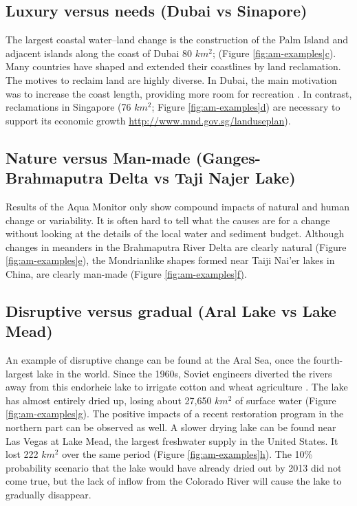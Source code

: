 \subsection{Luxury versus needs (Dubai vs Sinapore)}
The largest coastal water–land change is the construction of the Palm Island and adjacent islands along the coast of Dubai 80 $km^2$; (Figure \hyperref[fig:am-examples]{\ref{fig:am-examples}c}). Many countries have shaped and extended their coastlines by land reclamation. The motives to reclaim land are highly diverse. In Dubai, the main motivation was to increase the coast length, providing more room for recreation \citep{Davidson2009}. In contrast, reclamations in Singapore (76 $km^2$; Figure \hyperref[fig:am-examples]{\ref{fig:am-examples}d}) are necessary to support its economic growth \url{http://www.mnd.gov.sg/landuseplan}).

\subsection{Nature versus Man-made (Ganges-Brahmaputra Delta vs Taji Najer Lake)}
Results of the Aqua Monitor only show compound impacts of natural and human change or variability. It is often hard to tell what the causes are for a change without looking at the details of the local water
and sediment budget. Although changes in meanders in the Brahmaputra River Delta are clearly natural (Figure \hyperref[fig:am-examples]{\ref{fig:am-examples}e}), the Mondrianlike shapes formed near Taiji Nai’er lakes in China, are clearly man-made (Figure \hyperref[fig:am-examples]{\ref{fig:am-examples}f)}.

\subsection{Disruptive versus gradual (Aral Lake vs Lake Mead)}
An example of disruptive change can be found at the Aral Sea, once the fourth-largest lake in the world. Since the 1960s, Soviet engineers diverted the rivers away from this endorheic lake to irrigate cotton and wheat agriculture \citep{Glantz1999}. The lake has almost entirely dried up, losing about 27,650 $km^2$ of surface water (Figure \hyperref[fig:am-examples]{\ref{fig:am-examples}g}). The positive impacts of a recent restoration program \citep{Micklin2016} in the northern part can be observed as well. A slower drying lake can be found near Las Vegas at Lake Mead, the largest freshwater supply in the United States. It lost 222 $km^2$ over the same period (Figure \hyperref[fig:am-examples]{\ref{fig:am-examples}h}). The 10\% probability scenario that the lake would have already dried out by 2013 \citep{Barnett2008} did not come true, but the lack of inflow from the Colorado River will cause the lake to gradually disappear.

